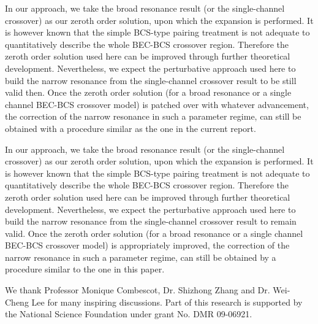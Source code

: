 \documentclass[reprint,pra]{revtex4-1}
\begin{document}

     In our approach, we take the broad resonance result (or the single-channel crossover) as our zeroth order solution, upon which the expansion is performed.  It is however known that the simple BCS-type pairing treatment is not adequate  to quantitatively describe the whole BEC-BCS crossover region.  Therefore the zeroth order solution used here can be improved through further theoretical development.  Nevertheless, we expect the perturbative approach used here to build the narrow resonance from the single-channel crossover result to be still valid then.  Once the zeroth order solution (for a broad resonance or a single channel BEC-BCS crossover model) is patched over with whatever advancement, the correction of the narrow resonance in such a parameter regime, can still be obtained with a procedure similar as the one in the current report.  

     In our approach, we take the broad resonance result (or the single-channel crossover) as our zeroth order solution, upon which the expansion is performed.  It is however known that the simple BCS-type pairing treatment is not adequate  to quantitatively describe the whole BEC-BCS crossover region.  Therefore the zeroth order solution used here can be improved through further theoretical development.  Nevertheless, we expect the perturbative approach used here to build the narrow resonance from the single-channel crossover result to remain valid.  Once the zeroth order solution (for a broad resonance or a single channel BEC-BCS crossover model) is appropriately improved, the correction of the narrow resonance in such a parameter regime, can still be obtained by  a procedure similar to the one in this paper.  

\begin{acknowledgements}
We thank  Professor Monique Combescot, Dr. Shizhong Zhang and  Dr. Wei-Cheng Lee for many inspiring discussions. Part of this research  is supported  by the National Science Foundation under grant No. DMR 09-06921. 
\end{acknowledgements}

\end{document}
